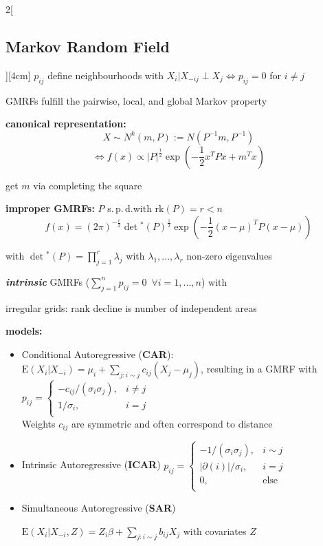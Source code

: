 \documentclass[8pt]{extarticle}
\begin{document}
\begin{multicols}{2}[\subsection{Markov Random Field}][4cm]
\noindent $p_{ij}$ define neighbourhoods with $X_i|X_{-ij} \perp X_j \Leftrightarrow p_{ij}{=}0$ for $i\neq j$

\noindent GMRFs fulfill the pairwise, local, and global Markov property

\textbf{canonical representation:}
$$X \sim N^k(m,P) :=N(P^{-1}m,P^{-1})$$ 
$$ \Leftrightarrow f(x) \propto |P|^{\frac{1}{2}}\exp\left(-\frac{1}{2} x^TPx +m ^Tx\right)$$

get $m$ via  completing the square

\textbf{improper GMRFs:} $P$ s.\,p.\,d.\@ with $\mathrm{rk}(P)=r<n$
$$f(x) =  ( 2\pi)^{-\frac{r}{2}}\det \!{}^{\ast}(P)^{\frac{1}{2}} \exp\left(-\frac{1}{2}(x-\mu)^TP(x-\mu)\right)$$

with $\det \!{}^{\ast}(P) = \prod_{j=1}^r \lambda_j$ with $\lambda_1,...,\lambda_r$ non-zero eigenvalues

\textbf{\textit{intrinsic}} GMRFs ($\sum_{j=1}^n p_{ij} = 0 \,\,\, \forall i=1,...,n$)  with

irregular grids: rank decline is number of independent areas

\textbf{models:}
\begin{itemize}
\item Conditional Autoregressive (\textbf{CAR}): $\mathrm{E}(X_i|X_{-i}) = \mu_i + \sum_{j:i\sim j} c_{ij}(X_j-\mu_j)$, resulting in  a GMRF with $p_{ij} =  \left\{
\begin{array}{rl}
{-}c_{ij}/(\sigma_i\sigma_j), & i\neq j \\
1/\sigma_i, &  i=j \\
\end{array}
\right. $ \\
Weights $c_{ij}$ are symmetric and often correspond to distance 

\item Intrinsic Autoregressive (\textbf{ICAR})
$p_{ij} =  \left\{
\begin{array}{rl}
{-}1/(\sigma_i\sigma_j), & i \sim j \\
|\partial(i)|/\sigma_i, &  i=j \\
0, &  \text{else}\\
\end{array}
\right. $ \\
\item Simultaneous Autoregressive (\textbf{SAR})

$\mathrm{E}(X_i|X_{-i}, Z)  =Z_i\beta + \sum_{j:i\sim j} b_{ij}X_j$ with covariates $Z$
\end{itemize}




\end{multicols}
\end{document}
